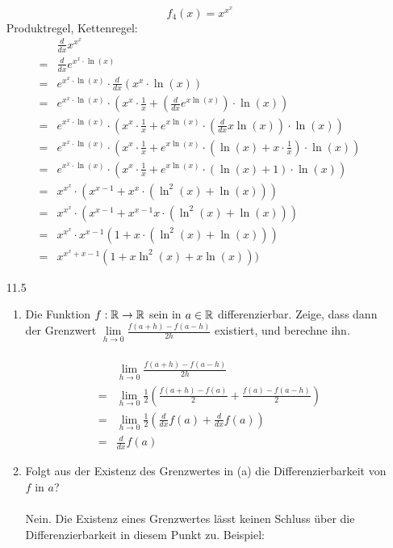 \documentclass{HM}
\begin{document}
\begin{enumerate}
$$f_4(x)=x^{x^x}$$
Produktregel, Kettenregel:
\begin{align*}
	&\frac{d}{dx}x^{x^x}\\
	=&\frac{d}{dx}e^{x^x\cdot\ln(x)}\\
	=&e^{x^x\cdot\ln(x)}\cdot\frac{d}{dx}\left(x^x\cdot\ln(x)\right)\\
	=&e^{x^x\cdot\ln(x)}\cdot\left(x^x\cdot\frac{1}{x}+\left(\frac{d}{dx}e^{x\ln(x)}\right)\cdot\ln(x)\right)\\
	=&e^{x^x\cdot\ln(x)}\cdot\left(x^x\cdot\frac{1}{x}+e^{x\ln(x)}\cdot\left(\frac{d}{dx}x\ln(x)\right)\cdot\ln(x)\right)\\
	=&e^{x^x\cdot\ln(x)}\cdot\left(x^x\cdot\frac{1}{x}+e^{x\ln(x)}\cdot\left(\ln(x)+x\cdot\frac{1}{x}\right)\cdot\ln(x)\right)\\
	=&e^{x^x\cdot\ln(x)}\cdot\left(x^x\cdot\frac{1}{x}+e^{x\ln(x)}\cdot(\ln(x)+1)\cdot\ln(x)\right)\\
	=&x^{x^x}\cdot(x^{x-1}+ x^x\cdot(\ln^2(x)+\ln(x)))\\
	=&x^{x^x}\cdot(x^{x-1}+ x^{x-1}x\cdot(\ln^2(x)+\ln(x)))\\
	=&x^{x^x}\cdot x^{x-1}(1+x\cdot(\ln^2(x)+\ln(x)))\\
	=&x^{x^x+x-1}(1+x\ln^2(x)+x\ln(x)))
\end{align*}
\newpage
\item [11.5]
\begin{enumerate}
	\item Die Funktion $f:\mathbb{R}\to\mathbb{R}$ sein in $a\in\mathbb{R}$ differenzierbar. Zeige, dass dann der Grenzwert $\lim\limits_{h\to 0}\frac{f(a+h)-f(a-h)}{2h}$ existiert, und berechne ihn.\\\\
	\begin{align*}
	&\lim\limits_{h\to 0}\frac{f(a+h)-f(a-h)}{2h}\\
	=&\lim\limits_{h\to 0}\frac{1}{2}\left(\frac{f(a+h)-f(a)}{2}+\frac{f(a)-f(a-h)}{2}\right)\\
	=&\lim\limits_{h\to 0}\frac{1}{2}\left(\frac{d}{dx}f(a)+\frac{d}{dx}f(a)\right)\\
	=&\frac{d}{dx}f(a)
	\end{align*}
	\item Folgt aus der Existenz des Grenzwertes in (a) die Differenzierbarkeit von $f$ in $a$?\\\\
	Nein. Die Existenz eines Grenzwertes lässt keinen Schluss über die Differenzierbarkeit in diesem Punkt zu. Beispiel:\\

\end{enumerate}
\end{enumerate}
\end{document}
